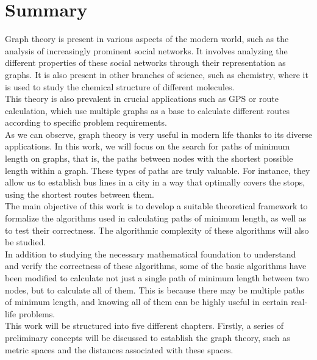 %

\chapter{Summary}

Graph theory is present in various aspects of the modern world, such as the analysis of increasingly prominent social networks. It involves analyzing the different properties of these social networks through their representation as graphs. It is also present in other branches of science, such as chemistry, where it is used to study the chemical structure of different molecules. \\

This theory is also prevalent in crucial applications such as GPS or route calculation, which use multiple graphs as a base to calculate different routes according to specific problem requirements. \\ 

As we can observe, graph theory is very useful in modern life thanks to its diverse applications. In this work, we will focus on the search for paths of minimum length on graphs, that is, the paths between nodes with the shortest possible length within a graph. These types of paths are truly valuable. For instance, they allow us to establish bus lines in a city in a way that optimally covers the stops, using the shortest routes between them. \\

The main objective of this work is to develop a suitable theoretical framework to formalize the algorithms used in calculating paths of minimum length, as well as to test their correctness. The algorithmic complexity of these algorithms will also be studied. \\

In addition to studying the necessary mathematical foundation to understand and verify the correctness of these algorithms, some of the basic algorithms have been modified to calculate not just a single path of minimum length between two nodes, but to calculate all of them. This is because there may be multiple paths of minimum length, and knowing all of them can be highly useful in certain real-life problems. \\

This work will be structured into five different chapters. Firstly, a series of preliminary concepts will be discussed to establish the graph theory, such as metric spaces and the distances associated with these spaces. \\

